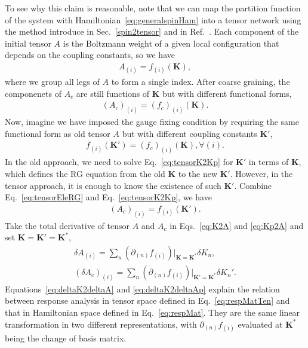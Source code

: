\documentclass[aps,prb,reprint,superscriptaddress]{revtex4-2}
\begin{document}
To see why this claim is reasonable, note that we can map the partition
function of the system with Hamiltonian~\eqref{eq:generalspinHam} into a
tensor network using the method introduce in Sec.~\ref{spin2tensor} and
in Ref.~\cite{trg}. Each component of the initial tensor $A$ is the
Boltzmann weight of a given local configuration that depends on the
coupling constants, so we have 
%
\begin{align}\label{eq:K2A}
    A_{(i)} = f_{(i)}\left(\mathbf{K}\right),
\end{align}
%
where we group all legs of $A$ to form a single index. After coarse
graining, the componenets of $A_c$ are still functions of $\mathbf{K}$ but
with different functional forms,
%
\begin{align}\label{eq:tensorEleRG}
    \left(A_c\right)_{(i)} =
\left(f_c\right)_{(i)}\left(\mathbf{K}\right).
\end{align}
%
Now, imagine we have imposed the gauge fixing condition by requiring the
same functional form as old tensor $A$ but with different coupling
constants $\mathbf{K}'$, 
%
\begin{align}\label{eq:tensorK2Kp}
    f_{(i)}\left(\mathbf{K}'\right) =
    \left(f_c\right)_{(i)}\left(\mathbf{K}\right), \forall (i).
\end{align}
%
In the old approach, we need to solve Eq.~\eqref{eq:tensorK2Kp} for
$\mathbf{K}'$ in terms of $\mathbf{K}$, which defines the RG equation
from the old $\mathbf{K}$ to the new $\mathbf{K}'$. However, in the
tensor approach, it is enough to know the existence of such
$\mathbf{K}'$. Combine Eq.~\eqref{eq:tensorEleRG} and
Eq.~\eqref{eq:tensorK2Kp}, we have
%
\begin{align}\label{eq:Kp2A}
    \left(A_c\right)_{(i)} = f_{(i)}\left(\mathbf{K}'\right).
\end{align}
%
Take the total derivative of tensor $A$ and $A_c$ in Eqs.~\eqref{eq:K2A}
and \eqref{eq:Kp2A} and set $\mathbf{K} = \mathbf{K}' = \mathbf{K}^*$,
%
\begin{align}
    \delta A_{(i)} = \sum_n \left(\partial_{(n)}
    f_{(i)}\right)\Bigr|_{\mathbf{K} = \mathbf{K}^*} \delta K_n,
    \label{eq:deltaK2deltaA} \\
    \left(\delta A_c \right)_{(i)} = \sum_n \left(\partial_{(n)}
    f_{(i)}\right)\Bigr|_{\mathbf{K}' = \mathbf{K}^*} \delta
    K_n'.\label{eq:deltaK2deltaAp}  
\end{align}
%
Equations~\eqref{eq:deltaK2deltaA} and \eqref{eq:deltaK2deltaAp} explain
the relation between response analysis in tensor space defined in
Eq.~\eqref{eq:respMatTen} and that in Hamiltonian space defined in
Eq.~\eqref{eq:respMat}. They are the same linear transformation in two
different representations, with $\partial_{(n)}f_{(i)}$ evaluated at
$\mathbf{K}^*$ being the change of basis matrix.
%
\end{document}
